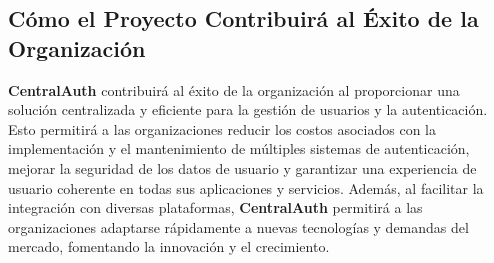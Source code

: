 \subsection{Cómo el Proyecto Contribuirá al Éxito de la Organización}

\textbf{CentralAuth} contribuirá al éxito de la organización al proporcionar una solución centralizada y eficiente para la gestión de usuarios y la autenticación. Esto permitirá a las organizaciones reducir los costos asociados con la implementación y el mantenimiento de múltiples sistemas de autenticación, mejorar la seguridad de los datos de usuario y garantizar una experiencia de usuario coherente en todas sus aplicaciones y servicios. Además, al facilitar la integración con diversas plataformas, \textbf{CentralAuth} permitirá a las organizaciones adaptarse rápidamente a nuevas tecnologías y demandas del mercado, fomentando la innovación y el crecimiento.
